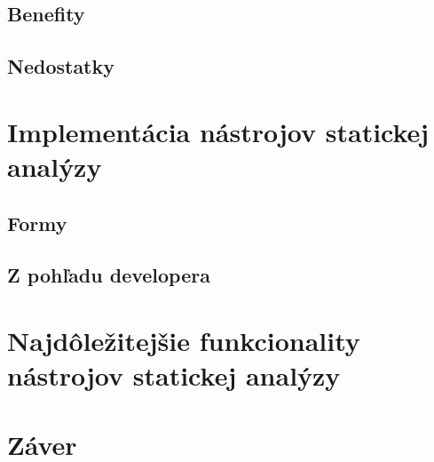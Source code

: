\documentclass[11pt,twoside,slovak,a4paper]{article}
\begin{document}
\subsection{Benefity} \label{vyuzitie:benefity}
\subsection{Nedostatky} \label{vyuzitie:nedostatky}

\section{Implementácia nástrojov statickej analýzy} \label{implementacia}
\subsection{Formy}\label{implementacia:formy}
\subsection{Z pohľadu developera}\label{implementacia:dev}

\section{Najdôležitejšie funkcionality nástrojov statickej analýzy} \label{funkcionality}

\section{Záver}






\pagebreak


\end{document}
